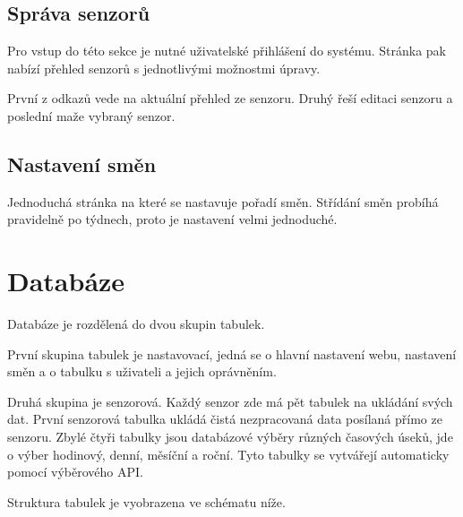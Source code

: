 \subsection{Správa senzorů}
Pro vstup do této sekce je nutné uživatelské přihlášení do systému.
Stránka pak nabízí přehled senzorů s jednotlivými možnostmi úpravy.

První z odkazů vede na aktuální přehled ze senzoru.
Druhý řeší editaci senzoru a poslední maže vybraný senzor.


\subsection{Nastavení směn}
Jednoduchá stránka na které se nastavuje pořadí směn.
Střídání směn probíhá pravidelně po týdnech, proto je nastavení velmi jednoduché.

\section{Databáze}
Databáze je rozdělená do dvou skupin tabulek.

První skupina tabulek je nastavovací, jedná se o hlavní nastavení webu, nastavení směn a o tabulku s uživateli a jejich oprávněním.

Druhá skupina je senzorová.
Každý senzor zde má pět tabulek na ukládání svých dat.
První senzorová tabulka ukládá čistá nezpracovaná data posílaná přímo ze senzoru.
Zbylé čtyři tabulky jsou databázové výběry různých časových úseků, jde o výber hodinový, denní, měsíční a roční.  
Tyto tabulky se vytvářejí automaticky pomocí výběrového API.

Struktura tabulek je vyobrazena ve schématu níže.
\fxnote[author=JA]{\textcolor{mygreen}{Scéma struktury tabulek}}






\newpage